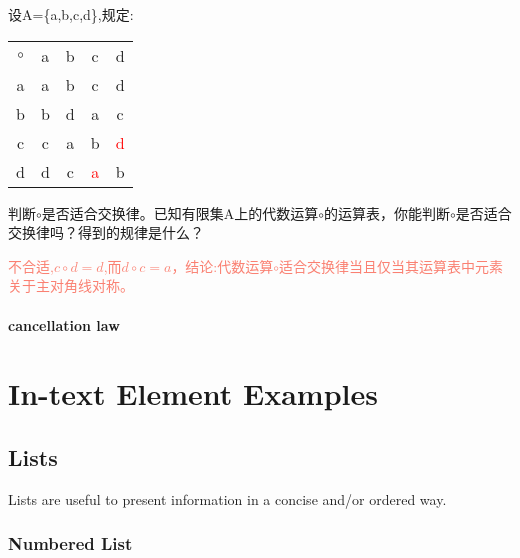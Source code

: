 \documentclass[
	11pt, %
	fleqn, %
	a4paper, %
]{LegrandOrangeBook}
\begin{document}
\begin{example}
	设A=\{a,b,c,d\},规定:
	\begin{center}
		\begin{table}[H]
			\centering
			\begin{tabular}{|c|c|c|c|c|}
				\cline{1-5}
				$\circ$ & a & b & c                  & d                  \\ \cline{1-5}
				a       & a & b & c                  & d                  \\ \cline{1-5}
				b       & b & d & a                  & c                  \\ \cline{1-5}
				c       & c & a & b                  & \textcolor{red}{d} \\ \cline{1-5}
				d       & d & c & \textcolor{red}{a} & b                  \\ \cline{1-5}
			\end{tabular}
		\end{table}
	\end{center}
	判断$\circ$是否适合交换律。已知有限集A上的代数运算$\circ$的运算表，你能判断$\circ$是否适合交换律吗？得到的规律是什么？

	\textcolor{Salmon}{不合适,$c\circ d=d$,而$d\circ c=a$，结论:代数运算$\circ$适合交换律当且仅当其运算表中元素关于主对角线对称。}
\end{example}

\subsubsection{cancellation law}
\chapter{In-text Element Examples}




\section{Lists}

Lists are useful to present information in a concise and/or ordered way.

\subsection{Numbered List}
\end{document}
